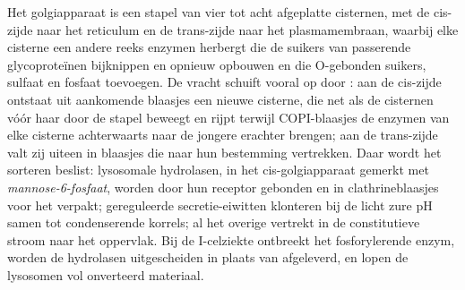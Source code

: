 \begin{proposition}\label{prop:b3:membrane-traffic:golgi}
Het golgiapparaat is een stapel van vier tot acht afgeplatte cisternen,
met de cis-zijde naar het reticulum en de trans-zijde naar het
plasmamembraan, waarbij elke cisterne een andere reeks enzymen herbergt
die de suikers van passerende glycoproteïnen bijknippen en opnieuw
opbouwen en die O-gebonden suikers, sulfaat en fosfaat toevoegen. De
vracht schuift vooral op door \emph{}: aan de cis-zijde
ontstaat uit aankomende blaasjes een nieuwe cisterne, die net als de
cisternen vóór haar door de stapel beweegt en rijpt terwijl
COPI-blaasjes de enzymen van elke cisterne achterwaarts naar de jongere
erachter brengen; aan de trans-zijde valt zij uiteen in blaasjes die
naar hun bestemming vertrekken. Daar wordt het sorteren beslist:
lysosomale hydrolasen, in het cis-golgiapparaat gemerkt met
\emph{mannose-6-fosfaat}, worden door hun receptor gebonden en in
clathrineblaasjes voor het  verpakt; gereguleerde
secretie-eiwitten klonteren bij de licht zure pH samen tot
condenserende korrels; al het overige vertrekt in de constitutieve
stroom naar het oppervlak. Bij de I-celziekte ontbreekt het
fosforylerende enzym, worden de hydrolasen uitgescheiden in plaats van
afgeleverd, en lopen de lysosomen vol onverteerd materiaal.
\end{proposition}

